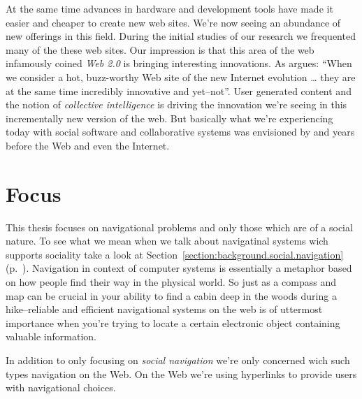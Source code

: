 At the same time advances in hardware and development tools have made it
easier and cheaper to create new web sites. We're now seeing an
abundance of new offerings in this field.
During the initial studies of our research we frequented
many of the these web sites. Our impression is that
this area of the web infamously coined \emph{Web 2.0}%
is bringing interesting innovations. As \citet[p.~18]{weiss05} argues:
``When we consider a hot, buzz-worthy Web site of the new Internet evolution
\ldots
they are at the same time incredibly innovative and yet--not''.
User generated content and the notion of \emph{collective intelligence} is
driving the innovation we're seeing in this incrementally new version of the
web. But basically what we're experiencing today with social software and
collaborative systems was envisioned by \citet{bush45} and
\citet{licklider68} years before the Web and even the Internet.

\section{Focus}

This thesis focuses on navigational problems and only those
which are of a social nature. To see what we mean when we talk about
navigatinal systems wich supports sociality take a look at
Section~\ref{section:background.social.navigation}
(p.~\pageref{section:background.social.navigation}).
Navigation in context of computer systems is
essentially a metaphor based on how people find their way in the physical
world. So just as a compass and map can be crucial in your ability to find a
cabin deep in the woods during a hike--reliable and efficient navigational
systems on the web is of uttermost importance when you're trying to locate a
certain electronic object containing valuable information.

In addition to only focusing on \emph{social navigation} we're only concerned
wich such types navigation on the Web.
On the Web we're using hyperlinks \citep[p.~90]{nelson65} to provide users
with navigational choices.


